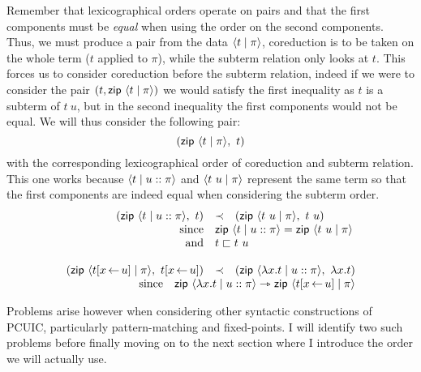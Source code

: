 Remember that lexicographical orders operate on pairs and that the first
components must be \emph{equal} when using the order on the second components.
Thus, we must produce a pair from the data \(\langle t \mid \pi \rangle\), coreduction
is to be taken on the whole term (\(t\) applied to \(\pi\)), while the subterm
relation only looks at \(t\).
This forces us to consider coreduction before the subterm relation, indeed if we
were to consider the pair \((t, \mathsf{zip}\ \langle t \mid \pi \rangle)\) we would satisfy the
first inequality as \(t\) is a subterm of \(t\ u\), but in the second inequality
the first components would not be equal.
We will thus consider the following pair:
\[
  (\mathsf{zip}\ \langle t \mid \pi \rangle,\ t)
\]
with the corresponding lexicographical order of coreduction and subterm
relation. This one works because \(\langle t \mid u :: \pi \rangle\) and
\(\langle t\ u \mid \pi \rangle\) represent the same term so that the first components
are indeed equal when considering the subterm order.
\[
  \begin{array}{rcl}
    (\zip\ \dpair{t \mid u :: \pi},\ t) &\prec&
    (\zip\ \dpair{t\ u \mid \pi},\ t\ u) \\
    \text{since} &
    \multicolumn{2}{l}{
      \zip\ \dpair{t \mid u :: \pi} = \zip\ \dpair{t\ u \mid \pi}
    } \\
    \text{and} &
    \multicolumn{2}{l}{t \sqsubset t\ u} \\
    \\
    (\zip\ \dpair{t[x \sto u] \mid \pi},\ t[x \sto u]) &\prec&
    (\zip\ \dpair{\lambda x.t \mid u :: \pi},\ \lambda x.t) \\
    \multicolumn{3}{r}{
      \text{since} \quad
      \zip\ \dpair{\lambda x.t \mid u :: \pi} \red
      \zip\ \dpair{t[x \sto u] \mid \pi}
    }
  \end{array}
\]

Problems arise however when considering other syntactic constructions of
\acrshort{PCUIC}, particularly pattern-matching and fixed-points.
I will identify two such problems before finally moving on to the next section
where I introduce the order we will actually use.

